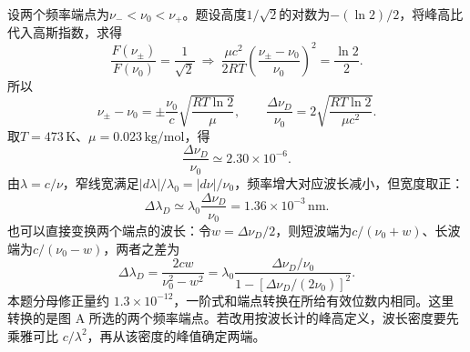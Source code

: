 \documentclass[UTF8,fontset=fandol,a4paper,11pt]{ctexart}
\begin{document}
设两个频率端点为$\nu_-<\nu_0<\nu_+$。题设高度$1/\sqrt2$的对数为$-(\ln2)/2$，将峰高比代入高斯指数，求得
\[
\frac{F(\nu_\pm)}{F(\nu_0)}=\frac1{\sqrt2}
\ \Longrightarrow\
\frac{\mu c^2}{2RT}
\left(\frac{\nu_\pm-\nu_0}{\nu_0}\right)^2=\frac{\ln2}{2}.
\]
所以
\[
\nu_\pm-\nu_0=\pm\frac{\nu_0}{c}\sqrt{\frac{RT\ln2}{\mu}},
\qquad
\boxed{\frac{\Delta\nu_D}{\nu_0}
=2\sqrt{\frac{RT\ln2}{\mu c^2}}}.
\]
取$T=473\,\mathrm K$、$\mu=0.023\,\mathrm{kg/mol}$，得
\[
\frac{\Delta\nu_D}{\nu_0}\simeq2.30\times10^{-6}.
\]
由$\lambda=c/\nu$，窄线宽满足$|d\lambda|/\lambda_0=|d\nu|/\nu_0$，频率增大对应波长减小，但宽度取正：
\[
\boxed{\Delta\lambda_D
\simeq\lambda_0\frac{\Delta\nu_D}{\nu_0}
=1.36\times10^{-3}\,\mathrm{nm}}.
\]
也可以直接变换两个端点的波长：令$w=\Delta\nu_D/2$，则短波端为$c/(\nu_0+w)$、长波端为$c/(\nu_0-w)$，两者之差为
\[
\Delta\lambda_D=\frac{2cw}{\nu_0^2-w^2}=\lambda_0\frac{\Delta\nu_D/\nu_0}{1-[\Delta\nu_D/(2\nu_0)]^2}.
\]
本题分母修正量约 $1.3\times10^{-12}$，一阶式和端点转换在所给有效位数内相同。这里转换的是图 A 所选的两个频率端点。若改用按波长计的峰高定义，波长密度要先乘雅可比 $c/\lambda^2$，再从该密度的峰值确定两端。
\end{document}
